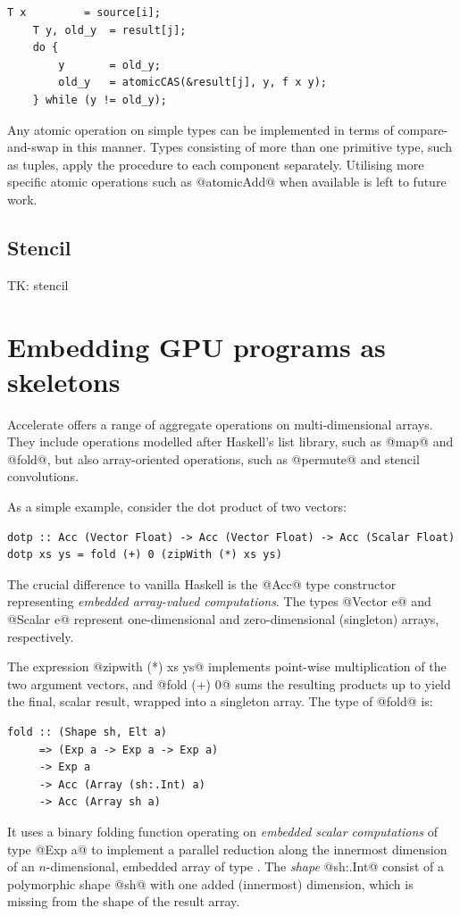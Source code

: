 \begin{lstlisting}[style=cuda]
    T x         = source[i];
    T y, old_y  = result[j];
    do {
        y       = old_y;
        old_y   = atomicCAS(&result[j], y, f x y);
    } while (y != old_y);
\end{lstlisting}
%
Any atomic operation on simple types can be implemented in terms of
compare-and-swap in this manner. Types consisting of more than one primitive
type, such as tuples, apply the procedure to each component separately.
Utilising more specific atomic operations such as @atomicAdd@ when
available is left to future work.

\subsection{Stencil}

TK: stencil


\section{Embedding GPU programs as skeletons}
\label{sec:code_generation}

Accelerate offers a range of aggregate operations on multi-dimensional arrays.
They include operations modelled after Haskell's list library, such as
@map@ and @fold@, but also array-oriented operations, such as
@permute@ and stencil convolutions.

As a simple example, consider the dot product of two vectors:
%
\begin{lstlisting}[style=haskell]
dotp :: Acc (Vector Float) -> Acc (Vector Float) -> Acc (Scalar Float)
dotp xs ys = fold (+) 0 (zipWith (*) xs ys)
\end{lstlisting}
%
The crucial difference to vanilla Haskell is the @Acc@ type constructor
representing \emph{embedded array-valued computations}. The types
@Vector e@ and @Scalar e@ represent one-dimensional and
zero-dimensional (singleton) arrays, respectively.

The expression @zipwith (*) xs ys@ implements point-wise multiplication of
the two argument vectors, and @fold (+) 0@ sums the resulting products up
to yield the final, scalar result, wrapped into a singleton array. The type of
@fold@ is:
%
\begin{lstlisting}[style=haskell]
fold :: (Shape sh, Elt a)
     => (Exp a -> Exp a -> Exp a)
     -> Exp a
     -> Acc (Array (sh:.Int) a)
     -> Acc (Array sh a)
\end{lstlisting}
%
It uses a binary folding function operating on \emph{embedded scalar
computations} of type @Exp a@ to implement a parallel reduction along the
innermost dimension of an $n$-dimensional, embedded array of type . The \emph{shape} @sh:.Int@ consist of a polymorphic shape
@sh@ with one added (innermost) dimension, which is missing from the shape
of the result array.


